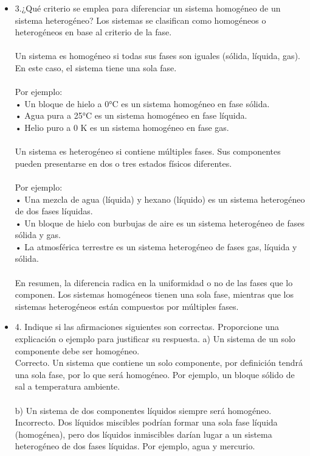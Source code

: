 \documentclass{article}
\begin{document}
\begin{itemize}
\\
\item{3.¿Qué criterio se emplea para diferenciar un sistema homogéneo de un sistema heterogéneo? }
Los sistemas se clasifican como homogéneos o heterogéneos en base al criterio de la fase.\\
\\
Un sistema es homogéneo si todas sus fases son iguales (sólida, líquida, gas). En este caso, el sistema tiene una sola fase.\\
\\
Por ejemplo:\\
• Un bloque de hielo a 0°C es un sistema homogéneo en fase sólida.\\
• Agua pura a 25°C es un sistema homogéneo en fase líquida.\\
• Helio puro a 0 K es un sistema homogéneo en fase gas.\\
\\
Un sistema es heterogéneo si contiene múltiples fases. Sus componentes pueden presentarse en dos o tres estados físicos diferentes.\\
\\
Por ejemplo:\\
• Una mezcla de agua (líquida) y hexano (líquido) es un sistema heterogéneo de dos fases líquidas.\\
• Un bloque de hielo con burbujas de aire es un sistema heterogéneo de fases sólida y gas.\\
• La atmosférica terrestre es un sistema heterogéneo de fases gas, líquida y sólida.\\
\\
En resumen, la diferencia radica en la uniformidad o no de las fases que lo componen. Los sistemas homogéneos tienen una sola fase, mientras que los sistemas heterogéneos están compuestos por múltiples fases.\\
\item{4. Indique si las afirmaciones siguientes son correctas. Proporcione una explicación o ejemplo para
justificar su respuesta. }
a) Un sistema de un solo componente debe ser homogéneo.\\
Correcto. Un sistema que contiene un solo componente, por definición tendrá una sola fase, por lo que será homogéneo. Por ejemplo, un bloque sólido de sal a temperatura ambiente.\\
\\
b) Un sistema de dos componentes líquidos siempre será homogéneo.\\
Incorrecto. Dos líquidos miscibles podrían formar una sola fase líquida (homogénea), pero dos líquidos inmiscibles darían lugar a un sistema heterogéneo de dos fases líquidas. Por ejemplo, agua y mercurio.\\

\end{itemize}
\end{document}
